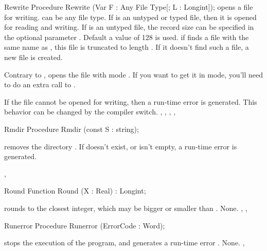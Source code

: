 \documentclass{report}
\begin{document}

\begin{procedure}{Rewrite}
\Declaration
Procedure Rewrite (Var F : Any File Type[; L : Longint]);
\Description
{} opens a file  for writing.  can be any file type.
If  is an untyped or typed file, then it is opened for reading and
writing. If  is an untyped file, the record size can be specified in
the optional parameter . Default a value of 128 is used.
if  finds a file with the same name as , this file is
truncated to length . If it doesn't find such a file, a new file is
created.

Contrary to \tp, \fpc opens the file with mode . If you want
to get it in  mode, you'll need to do an extra call to 
.

\Errors
If the file cannot be opened for writing, then a run-time error is
generated. This behavior can be changed by the  compiler switch.
\SeeAlso
{}, , , , 
\end{procedure}


\begin{procedure}{Rmdir}
\Declaration
Procedure Rmdir (const S : string);

\Description
{} removes the directory .
\Errors
If  doesn't exist, or isn't empty, a run-time error is generated.

\SeeAlso
{}, 
\end{procedure}


\begin{function}{Round}
\Declaration
Function Round (X : Real) : Longint;

\Description
{} rounds  to the closest integer, which may be bigger or
smaller than .
\Errors
None.
\SeeAlso
{}, , 
\end{function}


\begin{procedure}{Runerror}
\Declaration
Procedure Runerror (ErrorCode : Word);

\Description
{} stops the execution of the program, and generates a
run-time error .
\Errors
None.
\SeeAlso
{}, 
\end{procedure}
\end{document}
